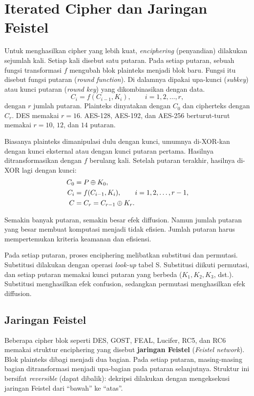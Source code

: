 \section{Iterated Cipher dan Jaringan Feistel}

Untuk menghasilkan cipher yang lebih kuat, \textit{enciphering} (penyandian)
dilakukan sejumlah kali. Setiap kali disebut satu putaran. Pada setiap putaran,
sebuah fungsi transformasi $f$ mengubah blok plainteks menjadi blok baru. Fungsi
itu disebut fungsi putaran (\textit{round function}). Di dalamnya dipakai
upa-kunci (\textit{subkey}) atau kunci putaran (\textit{round key}) yang
dikombinasikan dengan data.
\begin{equation}
C_i = f(C_{i-1}, K_i), \qquad i = 1, 2, \dots, r,
\label{eq:iterated-cipher}
\end{equation}
dengan $r$ jumlah putaran. Plainteks dinyatakan dengan $C_0$ dan cipherteks
dengan $C_r$. DES memakai $r = 16$. AES-128, AES-192, dan AES-256 berturut-turut
memakai $r = 10$, $12$, dan $14$ putaran.

Biasanya plainteks dimanipulasi dulu dengan kunci, umumnya di-XOR-kan dengan
kunci eksternal atau dengan kunci putaran pertama. Hasilnya ditransformasikan
dengan $f$ berulang kali. Setelah putaran terakhir, hasilnya di-XOR lagi dengan
kunci:
\begin{align}
C_0 &= P \oplus K_0, \notag \\
C_i &= f(C_{i-1}, K_i), \qquad i = 1, 2, \dots, r-1, \label{eq:iterated-kunci} \\
C &= C_r = C_{r-1} \oplus K_r. \notag
\end{align}

Semakin banyak putaran, semakin besar efek diffusion. Namun jumlah putaran yang
besar membuat komputasi menjadi tidak efisien. Jumlah putaran harus
mempertemukan kriteria keamanan dan efisiensi.

Pada setiap putaran, proses enciphering melibatkan substitusi dan permutasi.
Substitusi dilakukan dengan operasi \textit{look-up} tabel S. Substitusi diikuti
permutasi, dan setiap putaran memakai kunci putaran yang berbeda
($K_1, K_2, K_3$, dst.). Substitusi menghasilkan efek confusion, sedangkan
permutasi menghasilkan efek diffusion.

\subsection{Jaringan Feistel}

Beberapa cipher blok seperti DES, GOST, FEAL, Lucifer, RC5, dan RC6 memakai
struktur enciphering yang disebut \textbf{jaringan Feistel}
(\textit{Feistel network}). Blok plainteks dibagi menjadi dua bagian. Pada setiap
putaran, masing-masing bagian ditransformasi menjadi upa-bagian pada putaran
selanjutnya. Struktur ini bersifat \textit{reversible} (dapat dibalik): dekripsi
dilakukan dengan mengeksekusi jaringan Feistel dari ``bawah'' ke ``atas''.


